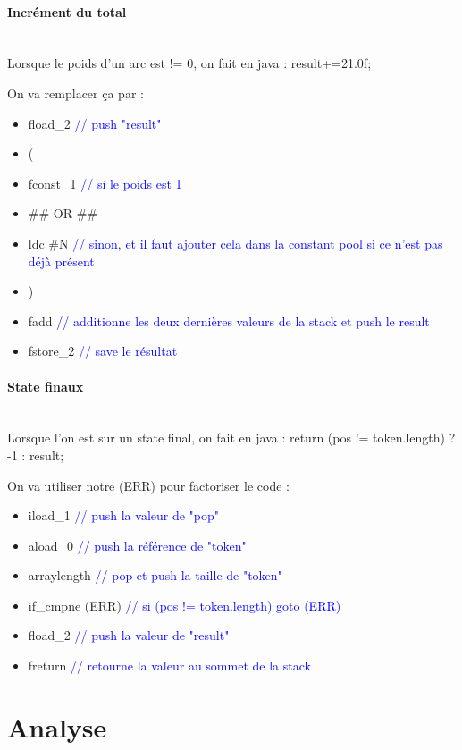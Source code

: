 \paragraph{Incrément du total}
~\\
Lorsque le poids d'un arc est != 0, on fait en java : result+=21.0f;

On va remplacer ça par :
\begin{itemize}
    \item[] fload\_2  \textcolor{blue}{// push "result"}
    \item[] (
    \item[] fconst\_1 \textcolor{blue}{// si le poids est 1}
    \item[] \#\# OR \#\#
    \item[] ldc \#N  \textcolor{blue}{// sinon, et il faut ajouter cela dans la constant pool si ce n'est pas déjà présent}
    \item[] )
    \item[] fadd  \textcolor{blue}{// additionne les deux dernières valeurs de la stack et push le result}
    \item[] fstore\_2 \textcolor{blue}{// save le résultat}
\end{itemize}

\paragraph{State finaux}
~\\
Lorsque l'on est sur un state final, on fait en java : return (pos != token.length) ? -1 : result;

On va utiliser notre (ERR) pour factoriser le code :
\begin{itemize}
    \item iload\_1  \textcolor{blue}{// push la valeur de "pop"}
    \item aload\_0  \textcolor{blue}{// push la référence de "token"}
    \item arraylength  \textcolor{blue}{// pop et push la taille de "token"}
    \item if\_cmpne (ERR) \textcolor{blue}{// si (pos != token.length) goto (ERR)}
    \item fload\_2  \textcolor{blue}{// push la valeur de "result"}
        \item freturn \textcolor{blue}{// retourne la valeur au sommet de la stack}
    \end{itemize}

\newpage
\section{Analyse}

